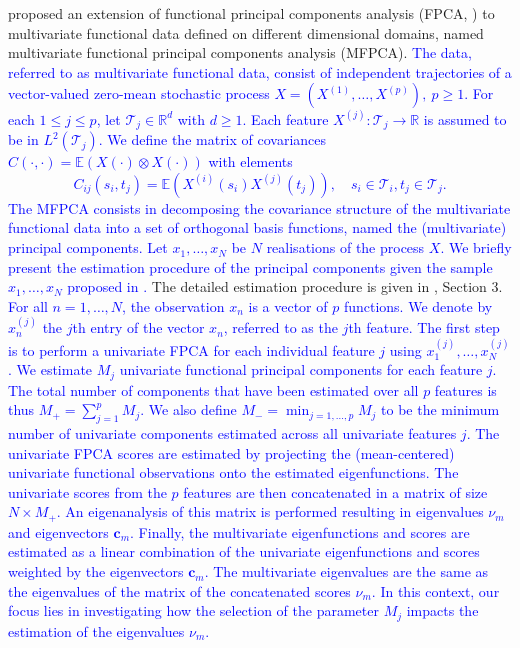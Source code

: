 \cite{happMultivariateFunctionalPrincipal2018} proposed an extension of functional principal components analysis (FPCA, \cite{ramsayFunctionalDataAnalysis2005}) to multivariate functional data defined on different dimensional domains, named multivariate functional principal components analysis (MFPCA). \textcolor{blue}{The data, referred to as multivariate functional data, consist of independent trajectories of a vector-valued zero-mean stochastic process $X = (X^{(1)}, \ldots, X^{(p)}),~p \geq 1$. For each $1 \leq j \leq p$, let $\mathcal{T}_j \in \mathbb{R}^d$ with $d \geq 1$. Each feature $X^{(j)}: \mathcal{T}_j \longrightarrow \mathbb{R}$ is assumed to be in $L^{2}(\mathcal{T}_j)$. We define the matrix of covariances $C(\cdot, \cdot) = \mathbb{E}(X(\cdot) \otimes X(\cdot))$ with elements
\begin{equation}\label{eq:cov}
C_{ij}(s_i, t_j) = \mathbb{E}(X^{(i)}(s_i)X^{(j)}(t_j)), \quad s_i \in \mathcal{T}_i, t_j \in \mathcal{T}_j.    
\end{equation}
The MFPCA consists in decomposing the covariance structure of the multivariate functional data into a set of orthogonal basis functions, named the (multivariate) principal components. Let $x_1, \dots, x_N$ be $N$ realisations of the process $X$. We briefly present the estimation procedure of the principal components given the sample $x_1, \dots, x_N$ proposed in \cite{happMultivariateFunctionalPrincipal2018}.} The detailed estimation procedure is given in \cite{happMultivariateFunctionalPrincipal2018}, Section 3. \textcolor{blue}{For all $n = 1, \dots, N$, the observation $x_n$ is a vector of $p$ functions. We denote by $x_n^{(j)}$ the $j$th entry of the vector $x_n$, referred to as the $j$th feature. The first step is to perform a univariate FPCA for each individual feature $j$ using $x_1^{(j)}, \dots, x_N^{(j)}$. We estimate $M_j$ univariate functional principal components for each feature $j$. The total number of components that have been estimated over all $p$ features is thus $M_+ = \sum_{j = 1}^p M_j$. We also define $M_{-} = \min_{j = 1, \dots, p} M_j$ to be the minimum number of univariate components estimated across all univariate features $j$. The univariate FPCA scores are estimated by projecting the (mean-centered) univariate functional observations onto the estimated eigenfunctions. The univariate scores from the $p$ features are then concatenated in a matrix of size $N \times M_+$. An eigenanalysis of this matrix is performed resulting in eigenvalues $\nu_m$ and eigenvectors $\mathbf{c}_m$. Finally, the multivariate eigenfunctions and scores are estimated as a linear combination of the univariate eigenfunctions and scores weighted by the eigenvectors $\mathbf{c}_m$. The multivariate eigenvalues are the same as the eigenvalues of the matrix of the concatenated scores $\nu_m$. In this context, our focus lies in investigating how the selection of the parameter $M_j$ impacts the estimation of the eigenvalues $\nu_m$.}

